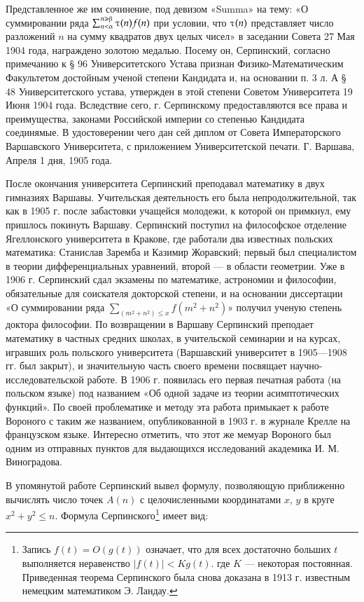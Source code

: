 \documentclass[12pt, a4paper, openany]{book}
\begin{document}
\hangindent=1.5cm  Представленное же им сочинение, под девизом «Summa» на тему: «О суммировании ряда $ \sum_{n<\alphaup}^{n\geqslant\betaup} \tauup(n)f(n) $ при условии, что $\tauup(n) $ представляет число разложений $n $ на сумму квадратов двух целых чисел» в заседании Совета 27 Мая 1904 года, награждено золотою медалью. Посему он, Серпинский, согласно примечанию к § 96 Университетского Устава признан Физико-Математическим Факультетом достойным ученой степени Кандидата и, на основании п. 3 л. А § 48 Университетского устава, утвержден в этой степени Советом Университета 19 Июня 1904 года. Вследствие сего, г. Серпинскому предоставляются все права и преимущества, законами Российской империи со степенью Кандидата соединямые. В удостоверении чего дан сей диплом от Совета Императорского Варшавского Университета, с приложением Университетской печати. Г. Варшава, Апреля 1 дня, 1905 года.
	
После окончания университета Серпинский преподавал математику в двух гимназиях Варшавы. Учительская деятельность его была непродолжительной, так как в 1905 г. после забастовки учащейся молодежи, к которой он примкнул, ему пришлось покинуть Варшаву. Серпинский поступил на философское отделение Ягеллонского университета в Кракове, где работали два известных польских математика: Станислав Заремба и Казимир Жоравский; первый был специалистом в теории дифференциальных уравнений, второй — в области геометрии. Уже в 1906 г. Серпинский сдал экзамены по математике, астрономии и философии, обязательные для соискателя докторской степени, и на основании диссертации «О суммировании ряда $ \sum_{(m^2+n^2)\leqslant x} f(m^2+n^2) $» получил ученую степень доктора философии. По возвращении в Варшаву Серпинский преподает математику в частных средних школах, в учительской семинарии и на курсах, игравших роль польского университета (Варшавский университет в 1905—1908 гг. был закрыт), и значительную часть своего времени посвящает научно-исследовательской работе. В 1906 г. появилась его первая печатная работа (на польском языке) под названием «Об одной задаче из теории асимптотических функций». По своей проблематике и методу эта работа примыкает к работе Вороного с таким же названием, опубликованной в 1903 г. в журнале Крелле на французском языке. Интересно отметить, что этот же мемуар Вороного был одним из отправных пунктов для выдающихся исследований академика И. М. Виноградова.

В упомянутой работе Серпинский вывел формулу, позволяющую приближенно вычислять число точек $A(n)$ с целочисленными координатами $x$, $y$ в круге $x^2+y^2\leqslant n$. Формула Серпинского{\footnote{Запись $f(t) = O(g(t))$ означает, что для всех достаточно больших $t$ выполняется неравенство $|f(t)| < Kg(t)$. где $K$ — некоторая постоянная. Приведенная теорема Серпинского была снова доказана в 1913 г. известным немецким математиком Э. Ландау.}} имеет вид:
\end{document}
